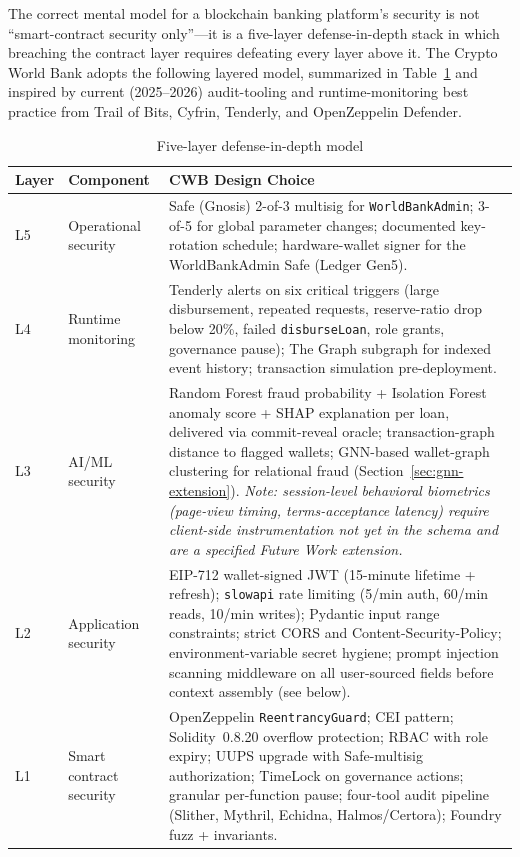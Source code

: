 \documentclass[12pt, a4paper]{report}
\newcommand{\tableheadcolor}{\rowcolor{TableHeadBg}}
\begin{document}
The correct mental model for a blockchain banking platform's security is not ``smart-contract security only''---it is a five-layer defense-in-depth stack in which breaching the contract layer requires defeating every layer above it. The Crypto World Bank adopts the following layered model, summarized in Table~\ref{tab:defense-layers} and inspired by current (2025--2026) audit-tooling and runtime-monitoring best practice from Trail of Bits, Cyfrin, Tenderly, and OpenZeppelin Defender.

\begin{table}[H]
\centering
\caption[Five-layer defense-in-depth model]{Five-layer defense-in-depth model}
\label{tab:defense-layers}
\begin{tabular}{p{1.4cm}p{4.0cm}p{8.5cm}}
\toprule
\tableheadcolor
\textbf{Layer} & \textbf{Component} & \textbf{CWB Design Choice} \\
\midrule
L5 & Operational security & Safe (Gnosis) 2-of-3 multisig for \texttt{WorldBankAdmin}; 3-of-5 for global parameter changes; documented key-rotation schedule; hardware-wallet signer for the WorldBankAdmin Safe (Ledger Gen5). \\
L4 & Runtime monitoring & Tenderly alerts on six critical triggers (large disbursement, repeated requests, reserve-ratio drop below 20\%, failed \texttt{disburseLoan}, role grants, governance pause); The Graph subgraph for indexed event history; transaction simulation pre-deployment. \\
L3 & AI/ML security & Random Forest fraud probability + Isolation Forest anomaly score + SHAP explanation per loan, delivered via commit-reveal oracle; transaction-graph distance to flagged wallets; GNN-based wallet-graph clustering for relational fraud (Section~\ref{sec:gnn-extension}). \textit{Note: session-level behavioral biometrics (page-view timing, terms-acceptance latency) require client-side instrumentation not yet in the schema and are a specified Future Work extension.} \\
L2 & Application security & EIP-712 wallet-signed JWT (15-minute lifetime + refresh); \texttt{slowapi} rate limiting (5/min auth, 60/min reads, 10/min writes); Pydantic input range constraints; strict CORS and Content-Security-Policy; environment-variable secret hygiene; prompt injection scanning middleware on all user-sourced fields before context assembly (see below). \\
L1 & Smart contract security & OpenZeppelin \texttt{ReentrancyGuard}; CEI pattern; Solidity~0.8.20 overflow protection; RBAC with role expiry; UUPS upgrade with Safe-multisig authorization; TimeLock on governance actions; granular per-function pause; four-tool audit pipeline (Slither, Mythril, Echidna, Halmos/Certora); Foundry fuzz + invariants. \\
\bottomrule
\end{tabular}
\end{table}
\end{document}
